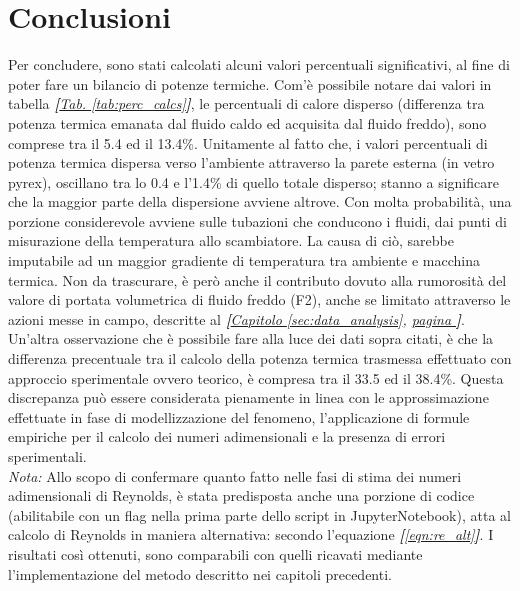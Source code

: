 \documentclass[a4paper,10pt]{article}                                                                                       %
\begin{document}
\section{Conclusioni}                                                                                                       %
\label{sec:conclusions}                                                                                                     %
  Per concludere, sono stati calcolati alcuni valori percentuali significativi, al fine di poter fare un bilancio di
  potenze termiche. Com'è possibile notare dai valori in tabella
  \textit{\textbf{[}\hyperref[tab:perc_calcs]{Tab. }\ref{tab:perc_calcs}\textbf{]}}, le percentuali di calore disperso
  (differenza tra potenza termica emanata dal fluido caldo ed acquisita dal fluido freddo), sono comprese tra il 5.4 ed il
  13.4\%. Unitamente al fatto che, i valori percentuali di potenza termica dispersa verso l'ambiente attraverso la parete
  esterna (in vetro pyrex), oscillano tra lo 0.4 e l'1.4\% di quello totale disperso; stanno a significare che la maggior
  parte della dispersione avviene altrove. Con molta probabilità, una porzione considerevole avviene sulle tubazioni che
  conducono i fluidi, dai punti di misurazione della temperatura allo scambiatore. La causa di ciò, sarebbe imputabile ad
  un maggior gradiente di temperatura tra ambiente e macchina termica. Non da trascurare, è però anche il contributo dovuto
  alla rumorosità del valore di portata volumetrica di fluido freddo (F2), anche se limitato attraverso le azioni messe in
  campo, descritte al \textit{\textbf{[}\hyperref[sec:data_analysis]{Capitolo }\ref{sec:data_analysis},
  \hyperref[sec:data_analysis]{pagina }\pageref{sec:data_analysis}\textbf{]}}. Un'altra osservazione che è possibile fare
  alla luce dei dati sopra citati, è che la differenza precentuale tra il calcolo della potenza termica trasmessa
  effettuato con approccio sperimentale ovvero teorico, è compresa tra il 33.5 ed il 38.4\%. Questa discrepanza può essere
  considerata pienamente in linea con le approssimazione effettuate in fase di modellizzazione del fenomeno, l'applicazione
  di formule empiriche per il calcolo dei numeri adimensionali e la presenza di errori sperimentali.\vspace{2mm}\\
  \textit{Nota:} Allo scopo di confermare quanto fatto nelle fasi di stima dei numeri adimensionali di Reynolds, è stata
  predisposta anche una porzione di codice (abilitabile con un flag nella prima parte dello script in JupyterNotebook),
  atta al calcolo di Reynolds in maniera alternativa: secondo l'equazione \textit{\textbf{[}\ref{eqn:re_alt}\textbf{]}}.
  I risultati così ottenuti, sono comparabili con quelli ricavati mediante l'implementazione del metodo descritto nei
  capitoli precedenti.
\clearpage                                                                                                                  %
\end{document}
